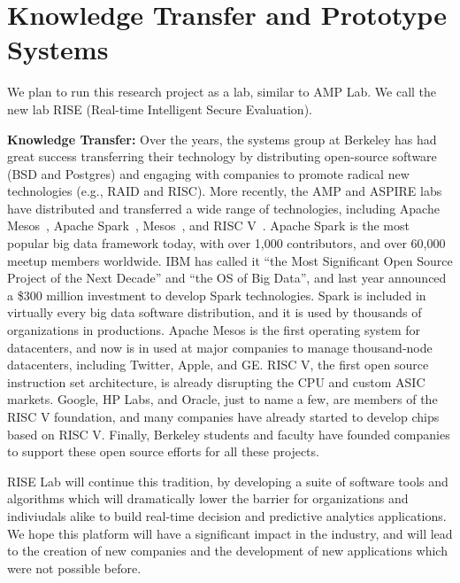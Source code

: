 \section{Knowledge Transfer and Prototype Systems}

We plan to run this research project as a lab, similar to AMP Lab. We call the new lab RISE (Real-time Intelligent Secure Evaluation). 

{\bf Knowledge Transfer:} Over the years, the systems group at Berkeley has had great success transferring their technology by distributing open-source software (\eg BSD and Postgres) and engaging with companies to promote radical new technologies (e.g., RAID and RISC).  More recently, the AMP and ASPIRE labs have distributed and transferred a wide range of technologies, including Apache Mesos~\cite{hindman2011mesos}, Apache Spark~\cite{spark}, Mesos~\cite{mesos}, and RISC V~\cite{risc-v}. Apache Spark is the most popular big data framework today, with over 1,000 contributors, and over 60,000 meetup members worldwide. IBM has called it ``the Most Significant Open Source Project of the Next Decade'' and ``the OS of Big Data'', and last year announced a \$300 million investment to develop Spark technologies. Spark is included in virtually every big data software distribution, and it is used by thousands of organizations in productions. Apache Mesos is the first operating system for datacenters, and now is in used at major companies to manage thousand-node datacenters, including Twitter, Apple, and GE.  RISC V, the first open source instruction set architecture, is already disrupting the CPU and custom ASIC markets. Google, HP Labs, and Oracle, just to name a few, are members of the RISC V foundation, and many companies have already started to develop chips based on RISC V. Finally, Berkeley students and faculty have founded companies to support these open source efforts for all these projects.

RISE Lab will continue this tradition, by developing a suite of software tools and algorithms which will dramatically lower the barrier for organizations and indiviudals alike to build real-time decision and predictive analytics applications. We hope this platform will have a significant impact in the industry, and will lead to the creation of new companies and the development of new applications which were not possible before.



